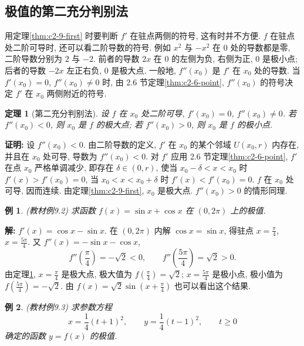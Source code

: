 \documentclass[UTF8,openany]{ctexbook}
\theoremstyle{chinesetextbook}
\newtheorem{example}{例}[section]
\newtheorem{theorem}{定理}[section]
\newenvironment{cnproof}{\par\indent\textbf{证明:} \ignorespaces}{\par}
\newenvironment{cnsolution}{\par\indent\textbf{解:} \ignorespaces}{\par}
\begin{document}
\subsection{极值的第二充分判别法}
用定理\ref{thm:c2-9-first} 时要判断 $f'$ 在驻点两侧的符号, 这有时并不方便. $f$ 在驻点处二阶可导时, 还可以看二阶导数的符号. 例如 $x^2$ 与 $-x^2$ 在 $0$ 处的导数都是零, 二阶导数分别为 $2$ 与 $-2$. 前者的导数 $2x$ 在 $0$ 的左侧为负, 右侧为正, $0$ 是极小点; 后者的导数 $-2x$ 左正右负, $0$ 是极大点. 一般地, $f''(x_0)$ 是 $f'$ 在 $x_0$ 处的导数. 当 $f'(x_0)=0$, $f''(x_0)\ne0$ 时, 由 2.6 节定理\ref{thm:c2-6-point}, $f''(x_0)$ 的符号决定 $f'$ 在 $x_0$ 两侧附近的符号.
\begin{theorem}[第二充分判别法]\label{thm:c2-9-second}
设 $f$ 在 $x_0$ 处二阶可导, $f'(x_0)=0$, $f''(x_0)\ne0$. 若 $f''(x_0)<0$, 则 $x_0$ 是 $f$ 的极大点; 若 $f''(x_0)>0$, 则 $x_0$ 是 $f$ 的极小点.
\end{theorem}
\begin{cnproof}
设 $f''(x_0)<0$. 由二阶导数的定义, $f'$ 在 $x_0$ 的某个邻域 $U(x_0,r)$ 内存在, 并且在 $x_0$ 处可导, 导数为 $f''(x_0)<0$. 对 $f'$ 应用 2.6 节定理\ref{thm:c2-6-point}, $f'$ 在点 $x_0$ 严格单调减少, 即存在 $\delta\in(0,r)$, 使当 $x_0-\delta<x<x_0$ 时 $f'(x)>f'(x_0)=0$, 当 $x_0<x<x_0+\delta$ 时 $f'(x)<f'(x_0)=0$. $f$ 在 $x_0$ 处可导, 因而连续. 由定理\ref{thm:c2-9-first}, $x_0$ 是极大点. $f''(x_0)>0$ 的情形同理.
\end{cnproof}
\begin{example}\label{ex:c2-9-2}
\textnormal{(教材例9.2)} 求函数 $f(x)=\sin x+\cos x$ 在 $(0,2\pi)$ 上的极值.
\end{example}
\begin{cnsolution}
$f'(x)=\cos x-\sin x$. 在 $(0,2\pi)$ 内解 $\cos x=\sin x$, 得驻点 $\displaystyle x=\frac\pi4$, $\displaystyle x=\frac{5\pi}4$. 又 $f''(x)=-\sin x-\cos x$,
\[
f''\left(\frac\pi4\right)=-\sqrt2<0,\qquad f''\left(\frac{5\pi}4\right)=\sqrt2>0.
\]
由定理\ref{thm:c2-9-second}, $\displaystyle x=\frac\pi4$ 是极大点, 极大值为 $\displaystyle f\left(\frac\pi4\right)=\sqrt2$; $\displaystyle x=\frac{5\pi}4$ 是极小点, 极小值为 $\displaystyle f\left(\frac{5\pi}4\right)=-\sqrt2$. 由 $\displaystyle f(x)=\sqrt2\sin\left(x+\frac\pi4\right)$ 也可以看出这个结果.
\end{cnsolution}
\begin{example}\label{ex:c2-9-3}
\textnormal{(教材例9.3)} 求参数方程
\[
x=\frac14(t+1)^2,\qquad y=\frac14(t-1)^2,\qquad t\ge0
\]
确定的函数 $y=f(x)$ 的极值.
\end{example}
\end{document}
